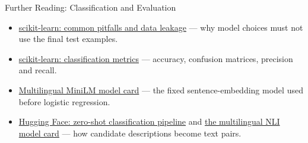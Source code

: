 \documentclass[aspectratio=169]{beamer}
\begin{document}
\begin{frame}{Further Reading: Classification and Evaluation}
  \small
  \begin{itemize}
    \item \href{https://scikit-learn.org/stable/common_pitfalls.html}{scikit-learn: common pitfalls and data leakage} --- why model choices must not use the final test examples.
    \item \href{https://scikit-learn.org/stable/modules/model_evaluation.html\#classification-metrics}{scikit-learn: classification metrics} --- accuracy, confusion matrices, precision and recall.
    \item \href{https://huggingface.co/sentence-transformers/paraphrase-multilingual-MiniLM-L12-v2}{Multilingual MiniLM model card} --- the fixed sentence-embedding model used before logistic regression.
    \item \href{https://huggingface.co/docs/transformers/en/main_classes/pipelines\#transformers.ZeroShotClassificationPipeline}{Hugging Face: zero-shot classification pipeline} and \href{https://huggingface.co/MoritzLaurer/mDeBERTa-v3-base-mnli-xnli}{the multilingual NLI model card} --- how candidate descriptions become text pairs.
  \end{itemize}
\end{frame}
\end{document}
